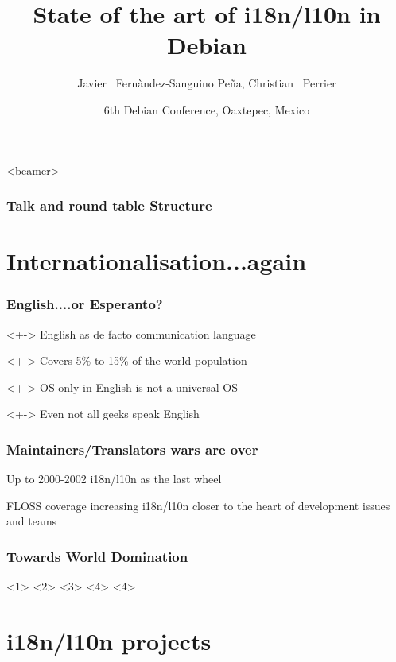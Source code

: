 \documentclass{beamer}
\title[State of the art of i18n/l10n in Debian] 
{State of the art of i18n/l10n in Debian}
\author[jfs, bubulle] 
{Javier ~Fernàndez-Sanguino Peña, Christian ~Perrier}
\date[Debconf 6] 
{6th Debian Conference, Oaxtepec, Mexico}
\begin{document}
\frame{\titlepage}

\begin{frame}<beamer>
    \frametitle{Talk and round table Structure}
    \tableofcontents[subsectionstyle=hide]
\end{frame}

\section{Internationalisation...again}


\begin{frame}
  \frametitle{English....or Esperanto?}
	\begin{block}<+->
		{English as de facto communication language}
	\end{block}
	\begin{block}<+->
		{Covers 5\% to 15\% of the world population}
	\end{block}
	\begin{block}<+->
		{OS only in English is not a universal OS}
	\end{block}
	\begin{block}<+->
		{Even not all geeks speak English}
	\end{block}
\end{frame}

\begin{frame}
  \frametitle{Maintainers/Translators wars are over}
	\begin{block}
		{Up to 2000-2002}
		i18n/l10n as the last wheel
	\end{block}
	\begin{block}
		{FLOSS coverage increasing}
		i18n/l10n closer to the heart of development issues and teams
	\end{block}
\end{frame}

\begin{frame}
  \frametitle{Towards World Domination}
  <1>
  <2>
  <3>
  <4>
  <4>
\end{frame}


\section{i18n/l10n projects}
\end{document}
